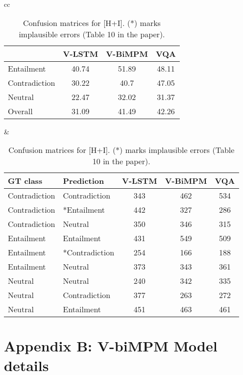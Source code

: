 \documentclass[11pt]{article}
\begin{document}
\begin{table}[!ht]
\small
\begin{center}
\begin{tabular}{cc}
\begin{tabular}{|l|ccc|}\hline
 & V-LSTM & V-BiMPM  & VQA\\ \hline
Entailment & 40.74& 51.89   & 48.11 \\ 
Contradiction & 30.22 & 40.7 & 47.05\\
Neutral  & 22.47 & 32.02 & 31.37\\\hline
Overall & 31.09 & 41.49 & 42.26\\\hline
\end{tabular}
&



\begin{tabular}{|ll|ccc|}\hline
GT class & Prediction & V-LSTM & V-BiMPM & VQA\\\hline
Contradiction & Contradiction & 343 & 462 & 534\\
Contradiction & *Entailment &  442 & 327 & 286\\
Contradiction & Neutral & 350 & 346 & 315 \\\hline
Entailment & Entailment & 431 & 549 & 509\\
Entailment & *Contradiction & 254 & 166 & 188\\
Entailment & Neutral & 373 & 343 & 361\\\hline
Neutral & Neutral & 240 & 342 & 335\\
Neutral & Contradiction &  377& 263 & 272\\
Neutral & Entailment & 451 & 463 & 461\\\hline
\end{tabular}
\end{tabular}
\caption{Confusion matrices for [H+I]. (*) marks implausible errors (Table 10 in the paper).} \label{tab:groundhyp-supp}
\end{center}
\end{table}

\pagebreak
\section*{Appendix B: V-biMPM Model details}
\def\nodesep{0.7cm}
\def\nodesepa{0.5cm}
\def\nodehwid{7pt}
\def\layersep{1.5cm}
\def\layersepa{0.9cm}
\usetikzlibrary{arrows,calc,fit}
\usetikzlibrary{positioning,shapes.multipart,shapes.callouts}
\usetikzlibrary{decorations.pathreplacing}
\end{document}
